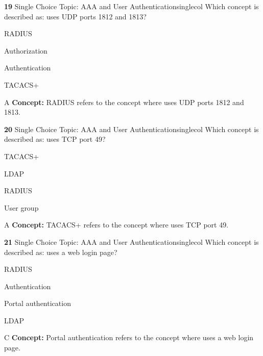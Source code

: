 \documentclass[10pt,a4paper]{article}
\begin{document}
\begin{qcard}{\color{white}\textbf{19} \hfill \small Single Choice \textbar{} Topic: AAA and User Authentication}{singlecol}
Which concept is described as: uses UDP ports 1812 and 1813?

\begin{qoptions}
\item RADIUS
\item Authorization
\item Authentication
\item TACACS+
\end{qoptions}
\begin{explainbox}{A}
\textbf{Concept:} RADIUS refers to the concept where uses UDP ports 1812 and 1813.
\end{explainbox}
\end{qcard}

\begin{qcard}{\color{white}\textbf{20} \hfill \small Single Choice \textbar{} Topic: AAA and User Authentication}{singlecol}
Which concept is described as: uses TCP port 49?

\begin{qoptions}
\item TACACS+
\item LDAP
\item RADIUS
\item User group
\end{qoptions}
\begin{explainbox}{A}
\textbf{Concept:} TACACS+ refers to the concept where uses TCP port 49.
\end{explainbox}
\end{qcard}

\begin{qcard}{\color{white}\textbf{21} \hfill \small Single Choice \textbar{} Topic: AAA and User Authentication}{singlecol}
Which concept is described as: uses a web login page?

\begin{qoptions}
\item RADIUS
\item Authentication
\item Portal authentication
\item LDAP
\end{qoptions}
\begin{explainbox}{C}
\textbf{Concept:} Portal authentication refers to the concept where uses a web login page.
\end{explainbox}
\end{qcard}
\end{document}
